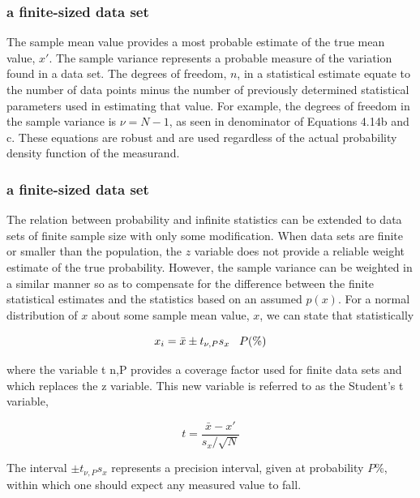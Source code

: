 \documentclass[fleqn]{beamer} %
\newcommand{\sectiontitleIII}{a finite-sized data set}
\begin{document}
	\begin{frame} \scriptsize
		\frametitle{\sectiontitleIII}    
		
		The sample mean value provides a most probable estimate of the true mean value, $x'$. The sample variance represents a probable measure of the
variation found in a data set. The degrees of freedom, $n$, in a statistical estimate equate to the number
of data points minus the number of previously determined statistical parameters used in estimating
that value. For example, the degrees of freedom in the sample variance is $\nu = N - 1$, as seen in
denominator of Equations 4.14b and c. These equations are robust and are used regardless of the
actual probability density function of the measurand.
		
		
	\end{frame}
	
	\begin{frame} \scriptsize
		\frametitle{\sectiontitleIII}    
		
		The relation between probability and infinite statistics can be extended to data sets of finite
sample size with only some modification. When data sets are finite or smaller than the population,
the $z$ variable does not provide a reliable weight estimate of the true probability. However, the
sample variance can be weighted in a similar manner so as to compensate for the difference between
the finite statistical estimates and the statistics based on an assumed $p(x)$. For a normal distribution
of $x$ about some sample mean value, $x$, we can state that statistically

\[x_i=\bar{x}\pm t_{\nu,P}s_x \hspace{3mm} P(\%)\]

where the variable t n,P provides a coverage factor used for finite data sets and which replaces the z
variable. This new variable is referred to as the Student’s t variable,

\[t=\frac{\bar{x}-x'}{s_x/\sqrt{N}} \]
		
		The interval $\pm t_{\nu,P}s_x$ represents a precision interval, given at probability $P\%$, within which one
should expect any measured value to fall.
		
	\end{frame}
\end{document}
